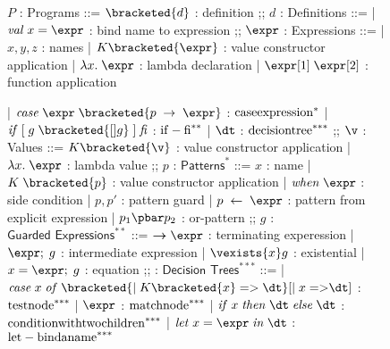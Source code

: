 \documentclass[manuscript,screen,review, 12pt]{acmart}
\begin{document}

\begin{figure}[h!p]
    \small
    \begin{flushleft}
        \begin{bnf}
        $P$ : \textsf{Programs} ::=
        $\bracketed{d}$ : definition
        ;;
        $d$ : \textsf{Definitions} ::=
        | $\mathit{val}\; x\; \mathit{=}\; \expr$ : bind name to expression
        ;;
        $\expr$ : Expressions ::= 
        | $x, y, z$             : names
        | $K\bracketed{\expr}$  : value constructor application 
        | $\lambda x.\; \expr$  : lambda declaration  
        | $\expr[1]\; \expr[2]$ : function application 
    
        | $\mathit{case}\; \expr\; \bracketed{p\; \rightarrow\; \expr}$ : $\rm{case expression}^{*}$
        | $\mathit{if}\; \mathit{[}\; g\; 
            \bracketed{[] g}\; \mathit{]}\; \mathit{fi}$                : $\rm{if-fi}^{**}$
        | $\dt$                                                         : $\rm{decision tree}^{***}$
        ;;
        $\v$ : Values ::= 
          $K\bracketed{\v}$     : value constructor application 
        | $\lambda x.\; \expr$  : lambda value 
        ;;
        $p$ : $\textsf{Patterns}^{*}$ ::= 
        $x$ : name 
        | $K\; \bracketed{p}$           : value constructor application 
        | $\mathit{when}\; \expr$       : side condition
        | $p, p'$                       : pattern guard 
        | $p\; \leftarrow\; \expr$      : pattern from explicit expression  
        | $p_{1}\pbar p_{2}$            : or-pattern
        ;;
        $g$ : $\textsf{Guarded Expressions}^{**}$ ::=  
        $\boldsymbol{\rightarrow}\expr$ : terminating experession
        | $\expr;\; g$                  : intermediate expression 
        | $\vexists{x} g$      : existential 
        | $x = \expr;\; g$              : equation 
        ;;
        \dt : $\textsf{Decision Trees}^{***}$ ::= 
        | $\mathit{case}\; x\; \mathit{of}\; 
            \bracketed{\vert\; K\bracketed{x}\; \mathit{=>}\; \dt} 
            [\vert\; x\; \mathit{=>} \dt]$                              : $\rm{test node }^{***}$
        | $\expr$                                                       : $\rm{match node }^{***}$
        | $\mathit{if}\; x\; \mathit{then}\; \dt\; \mathit{else}\; \dt$ : $\rm{condition with two children }^{***}$
        | $\mathit{let}\; x\; \mathit{=}\; \expr\; \mathit{in}\; \dt$   : $\rm{let-bind a name}^{***}$
        \end{bnf}
        \medskip
        

\end{flushleft}
\end{figure}
\end{document}
